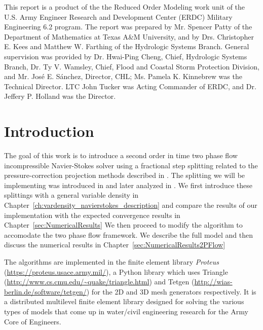 \documentclass[letterpaper]{erdc}
\begin{document}
This report is a product of the the Reduced Order Modeling work unit of the
U.S. Army Engineer Research and Development Center (ERDC) Military Engineering
6.2 program.  The report was prepared by Mr. Spencer Patty of the Department of
Mathematics at Texas A\&M University, and by Drs. Christopher E. Kees and
Matthew W. Farthing of the Hydrologic Systems Branch.  General supervision was
provided by Dr. Hwai-Ping Cheng, Chief, Hydrologic Systems Branch, Dr. Ty
V. Wamsley, Chief, Flood and Coastal Storm Protection Division, and
Mr. Jos\'{e} E. S\'{a}nchez, Director, CHL; Ms. Pamela K. Kinnebrew was the
Technical Director.  LTC John Tucker was Acting Commander of ERDC, and
Dr. Jeffery P. Holland was the Director.

\mainmatter

\chapter{Introduction}

The goal of this work is to introduce a second order in time two phase flow incompressible Navier-Stokes solver using a fractional step splitting related to the pressure-correction projection methods described in \cite{guermond2006overview}.  The splitting we will be implementing was introduced in \cite{guermond2009splitting} and later analyzed in \cite{guermond2011error}.  We first introduce these splittings with a general variable density in Chapter~\ref{ch:vardensity_navierstokes_description} and compare the results of our implementation with the expected convergence results in Chapter~\ref{sec:NumericalResults}  We then proceed to modify the algorithm to accomodate the two phase flow framework.  We describe the full model and then discuss the numerical results in Chapter~\ref{sec:NumericalResults2PFlow}

The algorithms are implemented in the finite element library \textit{Proteus} (\url{https://proteus.usace.army.mil/}), a Python library which uses Triangle (\url{http://www.cs.cmu.edu/~quake/triangle.html}) and Tetgen (\url{http://wias-berlin.de/software/tetgen/}) for the 2D and 3D mesh generators respectively.  It is a distributed multilevel finite element library designed for solving the various types of models that come up in water/civil engineering research for the Army Core of Engineers.






%
%
%
%
\end{document}
